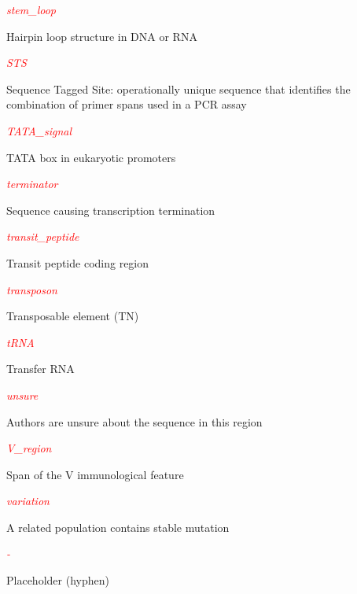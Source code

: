 \textcolor{red}{\textit{stem\_loop}}
\begin{adjustwidth}{1cm}{}
Hairpin loop structure in DNA or RNA
\end{adjustwidth}

\textcolor{red}{\textit{STS}}
\begin{adjustwidth}{1cm}{}
Sequence Tagged Site: operationally unique sequence that identifies the combination of primer spans used in a PCR assay
\end{adjustwidth}

\textcolor{red}{\textit{TATA\_signal}}
\begin{adjustwidth}{1cm}{}
TATA box in eukaryotic promoters
\end{adjustwidth}

\textcolor{red}{\textit{terminator}}
\begin{adjustwidth}{1cm}{}
Sequence causing transcription termination
\end{adjustwidth}

\textcolor{red}{\textit{transit\_peptide}}
\begin{adjustwidth}{1cm}{}
Transit peptide coding region
\end{adjustwidth}

\textcolor{red}{\textit{transposon}}
\begin{adjustwidth}{1cm}{}
Transposable element (TN)
\end{adjustwidth}

\textcolor{red}{\textit{tRNA}}
\begin{adjustwidth}{1cm}{}
Transfer RNA
\end{adjustwidth}

\textcolor{red}{\textit{unsure}}
\begin{adjustwidth}{1cm}{}
Authors are unsure about the sequence in this region
\end{adjustwidth}

\textcolor{red}{\textit{V\_region}}
\begin{adjustwidth}{1cm}{}
Span of the V immunological feature
\end{adjustwidth}

\textcolor{red}{\textit{variation}}
\begin{adjustwidth}{1cm}{}
A related population contains stable mutation
\end{adjustwidth}

\textcolor{red}{\textit{-}}
\begin{adjustwidth}{1cm}{}
Placeholder (hyphen)
\end{adjustwidth}

